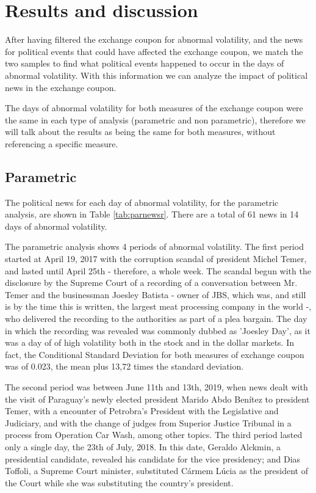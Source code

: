 \documentclass[a4paper]{article}
\begin{document}
\section{Results and discussion}

After having filtered the exchange coupon for abnormal volatility, and the news for political events that could have affected the exchange coupon, we match the two samples to find what political events happened to occur in the days of abnormal volatility. With this information we can analyze the impact of political news in the exchange coupon.

The days of abnormal volatility for both measures of the exchange coupon were the same in each type of analysis (parametric and non parametric), therefore we will talk about the results as being the same for both measures, without referencing a specific measure.

\subsection{Parametric}

The political news for each day of abnormal volatility, for the parametric analysis, are shown in Table \ref{tab:parnewsr}. There are a total of 61 news in 14 days of abnormal volatility.



The parametric analysis shows 4 periods of abnormal volatility. The first period started at April 19, 2017 with the corruption scandal of president Michel Temer, and lasted until April 25th - therefore, a whole week. The scandal begun with the disclosure by the Supreme Court of a recording of a conversation between Mr. Temer and the businessman Joesley Batista - owner of JBS, which was, and still is by the time this is written, the largest meat processing company in the world -, who delivered the recording to the authorities as part of a plea bargain. The day in which the recording was revealed was commonly dubbed as 'Joesley Day', as it was a day of of high volatility both in the stock and in the dollar markets. In fact, the Conditional Standard Deviation for both measures of exchange coupon was of 0.023, the mean plus 13,72 times the standard deviation.

The second period was between June 11th and 13th, 2019, when news dealt with the visit of Paraguay's newly elected president Marido Abdo Benítez to president Temer, with a encounter of Petrobra's President with the Legislative and Judiciary, and with the change of judges from Superior Justice Tribunal in a process from Operation Car Wash, among other topics. The third period lasted only a single day, the 23th of July, 2018. In this date, Geraldo Alckmin, a presidential candidate, revealed his candidate for the vice presidency; and Dias Toffoli, a Supreme Court minister, substituted Cármem Lúcia as the president of the Court while she was substituting the country's president.
\end{document}
